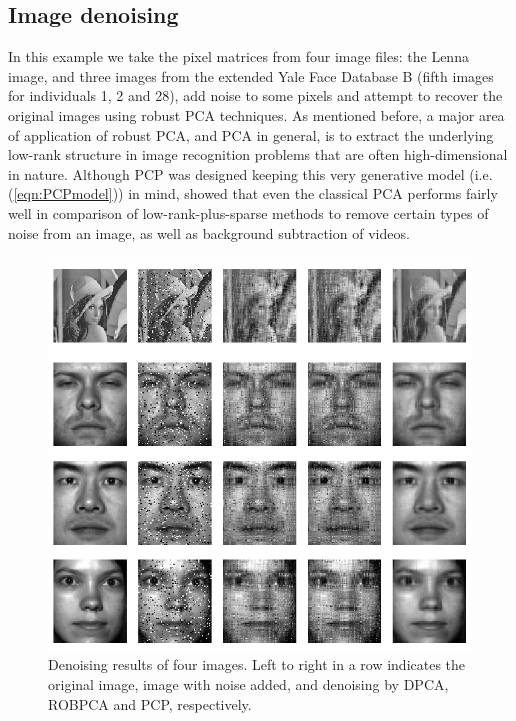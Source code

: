 \subsection*{\sffamily \large Image denoising}
In this example we take the pixel matrices from four image files: the Lenna image, and three images from the extended Yale Face Database B \citep{GeBeKr01,KCLee05} (fifth images for individuals 1, 2 and 28), add noise to some pixels and attempt to recover the original images using robust PCA techniques. As mentioned before, a major area of application of robust PCA, and PCA in general, is to extract the underlying low-rank structure in image recognition problems that are often high-dimensional in nature. Although PCP was designed keeping this very generative model (i.e. (\ref{eqn:PCPmodel})) in mind, \cite{ZhaoEtal14} showed that even the classical PCA performs fairly well in comparison of low-rank-plus-sparse methods to remove certain types of noise from an image, as well as background subtraction of videos.

\begin{figure}[t]
\centering
\includegraphics[width=.8\textwidth]{all_denoise}
\caption{Denoising results of four images. Left to right in a row indicates the original image, image with noise added, and denoising by DPCA, ROBPCA and PCP, respectively.}
\label{fig:figDenoise}
\end{figure}

